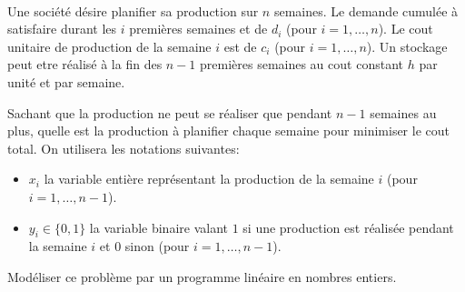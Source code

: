 \begin{td-exo}[Modélisation]\,\\ %
	Une société désire planifier sa production sur \(n\) semaines.
	Le demande cumulée à satisfaire durant les \(i\) premières semaines et de \(d_i\) (pour \(i=1, \ldots, n\)).
	Le cout unitaire de production de la semaine \(i\) est de \(c_i\) (pour \(i=1, \ldots, n\)).
	Un stockage peut etre réalisé à la fin des \(n-1\) premières semaines au cout constant \(h\) par unité et par semaine.

	Sachant que la production ne peut se réaliser que pendant \(n-1\) semaines au plus, quelle est la production à planifier chaque semaine pour minimiser le cout total. 
	On utilisera les notations suivantes:
	\begin{itemize}
		\item \(x_i\) la variable entière représentant la production de la semaine \(i\) (pour \(i=1, \ldots, n-1\)).
		\item \(y_i \in \{0,1\}\) la variable binaire valant \(1\) si une production est réalisée pendant la semaine \(i\) et \(0\) sinon (pour \(i=1, \ldots, n-1\)).
	\end{itemize}
	Modéliser ce problème par un programme linéaire en nombres entiers.
\end{td-exo}

